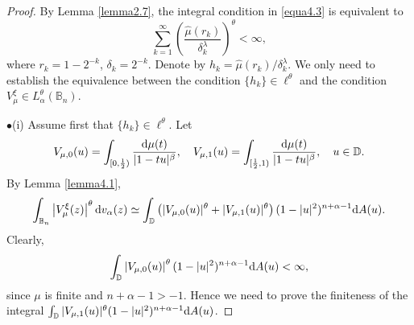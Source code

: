 \documentclass[preprint,12pt,times]{elsarticle}
\theoremstyle{definition}
\theoremstyle{remark}
\numberwithin{equation}{section}
\begin{document}
\begin{proof}
By Lemma \ref{lemma2.7}, the integral condition in \eqref{equa4.3} is equivalent to
\[
    \sum_{k=1}^{\infty}\left(\frac{\hat{\mu}(r_k)}{\delta_k^{\lambda}}\right)^{\theta}<\infty,
\]
where $r_k=1-2^{-k}$, $\delta_k=2^{-k}$. Denote by $h_k=\hat{\mu}(r_k)/\delta_k^{\lambda}$. We only need to establish the equivalence between the condition   $\{h_k\}\in \ell^{\theta}$  and the condition $V_{\mu}^{\xi}\in L_{\alpha}^{\theta}(\mathbb{B}_n)$.

$\bullet$(i) Assume first that   $\{h_k\}\in \ell^{\theta}$. Let
\[
    V_{\mu,0}(u)=\int_{[0,\frac{1}{2})}\frac{{\rm d}\mu(t)}{|1-tu|^{\beta}},\quad V_{\mu,1}(u)=\int_{[\frac{1}{2}, 1)}\frac{{\rm d}\mu(t)}{|1-tu|^{\beta}},\quad u\in\mathbb{D}.
\]
By Lemma \ref{lemma4.1}, 
\begin{equation*}
\int_{\mathbb{B}_n}\left|V_{\mu}^{\xi}(z)\right|^{\theta}{\rm d}v_{\alpha}(z)\simeq \int_{\mathbb{D}}\left(|V_{\mu,0}(u)|^{\theta}+|V_{\mu,1}(u)|^{\theta}\right)(1-|u|^2)^{n+\alpha-1}{\rm d}A(u).
\end{equation*}
Clearly, 
\[
    \int_{\mathbb{D}}\left|V_{\mu,0}(u)\right|^{\theta}(1-|u|^2)^{n+\alpha-1}{\rm d}A(u)<\infty,
\]
since $\mu$ is finite and $n+\alpha-1>-1$. Hence we need to prove the finiteness of the integral $\int_{\mathbb{D}}|V_{\mu,1}(u)|^{\theta}(1-|u|^2)^{n+\alpha-1}{\rm d}A(u)$.


\end{proof}
\end{document}
